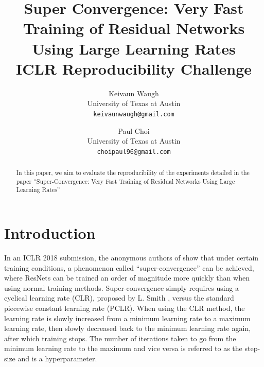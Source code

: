 \documentclass[10pt,twocolumn,letterpaper]{article}
\begin{document}
\title{
    Super Convergence: Very Fast Training of Residual Networks Using Large
    Learning Rates\\
    \large ICLR Reproducibility Challenge}

\author{Keivaun Waugh\\
University of Texas at Austin\\
{\tt\small keivaunwaugh@gmail.com}
\and
Paul Choi\\
University of Texas at Austin\\
{\tt\small choipaul96@gmail.com}
}

\maketitle

\begin{abstract}
In this paper, we aim to evaluate the reproducibility of the experiments
    detailed in the paper ``Super-Convergence: Very Fast Training of Residual
    Networks Using Large Learning Rates'' \cite{SuperConvergence}
\end{abstract}

\section{Introduction}
In an ICLR 2018 submission, the anonymous authors of \cite{SuperConvergence}
show that under certain training conditions, a phenomenon called
``super-convergence'' can be achieved, where ResNets \cite{ResNet} can be
trained an order of magnitude more quickly than when using normal training
methods.  Super-convergence simply requires using a cyclical learning rate
(CLR), proposed by L. Smith \cite{CLR}, versus the standard piecewise constant
learning rate (PCLR). When using the CLR method, the learning rate is slowly
increased from a minimum learning rate to a maximum learning rate, then slowly
decreased back to the minimum learning rate again, after which training stops.
The number of iterations taken to go from the minimum learning rate to the
maximum and vice versa is referred to as the step-size and is a hyperparameter.
\end{document}
